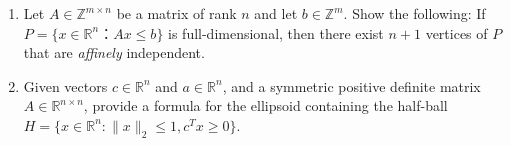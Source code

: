 \documentclass[11pt]{article}
\institute{\'Ecole Polytechnique F\'ed\'erale de Lausanne}
\DeclareMathOperator{\conv}{conv}
\newcommand{\setR}{\mathbb{R}}
\begin{document}
\makeheader

\begin{enumerate}[1)]


    
\item Let $A ∈ ℤ^{m ×n}$ be a matrix of rank $n$ and let $b ∈ ℤ^m$. Show the following: If $P = \{ x ∈ ℝ^n ： Ax ≤ b\}$ is full-dimensional, then there exist $n+1$ vertices of $P$ that are \textit{affinely} independent. 


\item Given vectors $c∈\setR^n$ and $a∈\setR^n$, and a symmetric positive definite matrix $A∈\setR^{n×n}$, provide a formula for the ellipsoid containing the half-ball $H= \{x∈\setR^n : ∥x∥_2≤1, c^Tx≥0\}$.
  





\end{enumerate}




  
\end{document}
